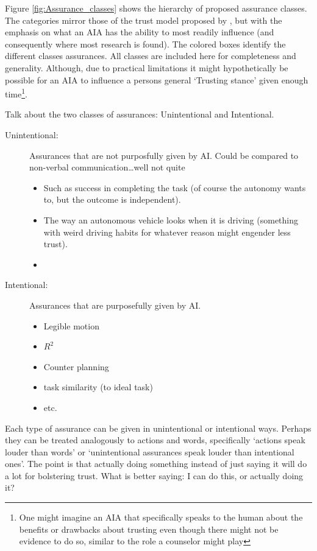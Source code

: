     

    Figure \ref{fig:Assurance_classes} shows the hierarchy of proposed assurance classes. The categories mirror those of the trust model proposed by \citet{McKnight2001-fa}, but with the emphasis on what an AIA has the ability to most readily influence (and consequently where most research is found). The colored boxes identify the different classes assurances. All classes are included here for completeness and generality. Although, due to practical limitations it might hypothetically be possible for an AIA to influence a persons general `Trusting stance' given enough time\footnote{One might imagine an AIA that specifically speaks to the human about the benefits or drawbacks about trusting even though there might not be evidence to do so, similar to the role a counselor might play}.

    Talk about the two classes of assurances: Unintentional and Intentional.

    \begin{description}
        \item [Unintentional:] Assurances that are not purposfully given by AI. Could be compared to non-verbal communication\ldots well not quite
        \begin{itemize}
            \item Such as success in completing the task (of course the autonomy wants to, but the outcome is independent).
            \item The way an autonomous vehicle looks when it is driving (something with weird driving habits for whatever reason might engender less trust). 
            \item 
        \end{itemize}
        \item [Intentional:] Assurances that are purposefully given by AI.
        \begin{itemize}
            \item Legible motion
            \item $R^2$
            \item Counter planning
            \item task similarity (to ideal task)
            \item etc.
        \end{itemize}
    \end{description}

    Each type of assurance can be given in unintentional or intentional ways. Perhaps they can be treated analogously to actions and words, specifically `actions speak louder than words' or `unintentional assurances speak louder than intentional ones'. The point is that actually doing something instead of just saying it will do a lot for bolstering trust. What is better saying: I can do this, or actually doing it?

